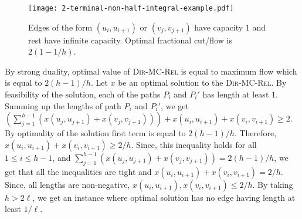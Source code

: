 \documentclass[11pt]{article}
\def\DirMCRel{\textsc{Dir-MC-Rel}\xspace}
\begin{document}
\begin{figure}[hbt]
\centering
\texttt{[image: 2-terminal-non-half-integral-example.pdf]}
\caption{Edges of the form $(u_i,u_{i+1})$ or $(v_j,v_{j+1})$ have capacity $1$
  and rest have infinite capacity. Optimal fractional cut/flow is $2(1-1/h)$.}
\label{fig:2-terminal-non-half-integral-example}
\end{figure}


By strong duality, optimal value of \DirMCRel is equal to maximum flow which is
equal to $2(h-1)/h$. Let $x$ be an optimal solution to the
\DirMCRel. By feasibility of the solution, each of the paths $P_i$ and
$P_i'$ has length at least $1$. Summing up the lengths of path $P_i$
and $P_i'$, we get $\left(\sum_{j=1}^{h-1} (x(u_j,u_{j+1}) +
  x(v_j,v_{j+1}))\right) + x(u_i,u_{i+1}) + x(v_i,v_{i+1}) \geq 2$. By
optimality of the solution first term is equal to
$2(h-1)/h$. Therefore, $x(u_i,u_{i+1}) + x(v_i,v_{i+1}) \geq
2/h$. Since, this inequality holds for all $1\leq i \leq h-1$, and
$\sum_{j = 1}^{h-1} (x(u_j,u_{j+1}) + x(v_j,v_{j+1})) = 2(h-1)/h$, we get that all
the inequalities are tight and $x(u_i,u_{i+1}) + x(v_i,v_{i+1}) =
2/h$. Since, all lengths are non-negative, $x(u_i,u_{i+1}),
x(v_i,v_{i+1}) \leq 2/h$. By taking $h > 2\ell$, we get an instance where
optimal solution has no edge having length at least $1/\ell$.
\end{document}
